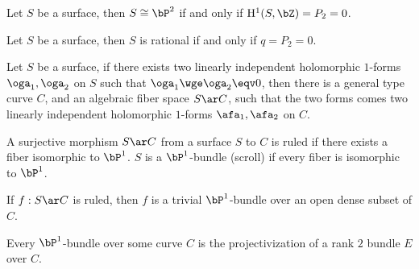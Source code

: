 \documentclass[a4paper, twoside]{article}
\begin{document}

\begin{thm}
	Let $S$ be a surface, then $S\cong\bP^{2}$ if and only if  $\mathrm{H}_{}^{1}(S,\bZ)=P_{2}=0$.
\end{thm}

\begin{thm}
	Let $S$ be a surface, then $S$ is rational if and only if $q=P_{2}=0$.
\end{thm}

\begin{thm}
	Let $S$ be a surface, if there exists two linearly independent holomorphic $1$-forms $\oga_{1},\oga_{2}$ on $S$ such that $\oga_{1}\wge\oga_{2}\eqv0$, then there is a general type curve $C$, and an algebraic fiber space $S\ar C$, such that the two forms comes two linearly independent holomorphic $1$-forms $\afa_{1},\afa_{2}$ on $C$.
\end{thm}



\begin{dfn}
	A surjective morphism $S\ar C$ from a surface $S$ to $C$ is ruled if there exists a fiber isomorphic to $\bP^{1}$. $S$ is a $\bP^{1}$-bundle (scroll) if every fiber is isomorphic to $\bP^{1}$.
\end{dfn}

\begin{thm}
	If $f:S\ar C$ is ruled, then $f$ is a trivial $\bP^{1}$-bundle over an open dense subset of $C$.
\end{thm}

\begin{thm}[Theorem~4.6]
	Every $\bP^{1}$-bundle over some curve $C$ is the projectivization of a rank $2$ bundle $E$ over $C$.
\end{thm}
\end{document}
